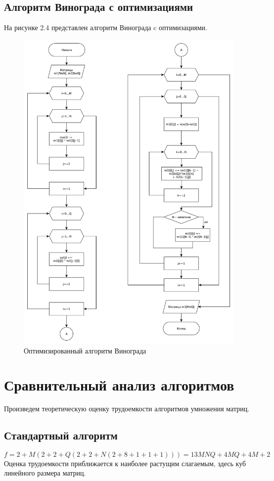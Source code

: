 \subsection{Алгоритм Винограда с оптимизациями}
На рисунке 2.4 представлен алгоритм Винограда c оптимизациями.
\begin{figure}
\centering
\includegraphics[scale=0.41]{shema3.pdf}
\caption{Оптимизированный алгоритм Винограда}
\end{figure}

\section{Сравнительный анализ алгоритмов}
Произведем теоретическую оценку трудоемкости алгоритмов умножения матриц.
\subsection{Стандартный алгоритм}
		$$f=2+M(2+2+Q(2+2+N(2+8+1+1+1)))=13MNQ+4MQ+4M+2$$
		Оценка трудоемкости приближается к наиболее растущим слагаемым, здесь куб линейного размера матриц. 
